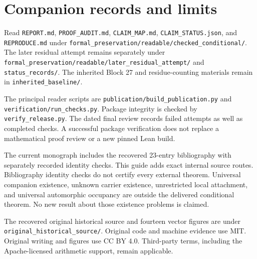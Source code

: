 \documentclass[11pt]{article}
\newcommand{\code}[1]{\nolinkurl{#1}}
\begin{document}
\clearpage
\section{Companion records and limits}
Read \code{REPORT.md}, \code{PROOF_AUDIT.md}, \code{CLAIM_MAP.md},
\code{CLAIM_STATUS.json}, and \code{REPRODUCE.md} under
\code{formal_preservation/readable/checked_conditional/}. The later residual
attempt remains separately under
\code{formal_preservation/readable/later_residual_attempt/} and
\code{status_records/}. The inherited Block 27 and residue-counting materials
remain in \code{inherited_baseline/}.

The principal reader scripts are \code{publication/build_publication.py} and
\code{verification/run_checks.py}. Package integrity is checked by
\code{verify_release.py}. The dated final review records failed attempts as well
as completed checks. A successful package verification does not replace a
mathematical proof review or a new pinned Lean build.

The current monograph includes the recovered 23-entry bibliography with
separately recorded identity checks. This guide adds exact internal source
routes. Bibliography identity checks do not certify every external theorem. Universal companion existence, unknown carrier existence, unrestricted
local attachment, and universal automorphic occupancy are outside the delivered
conditional theorem. No new result about those existence problems is claimed.

The recovered original historical source and fourteen vector figures are under
\code{original_historical_source/}. Original code and machine evidence use MIT.
Original writing and figures use CC BY 4.0. Third-party terms, including the
Apache-licensed arithmetic support, remain applicable.
\end{document}
